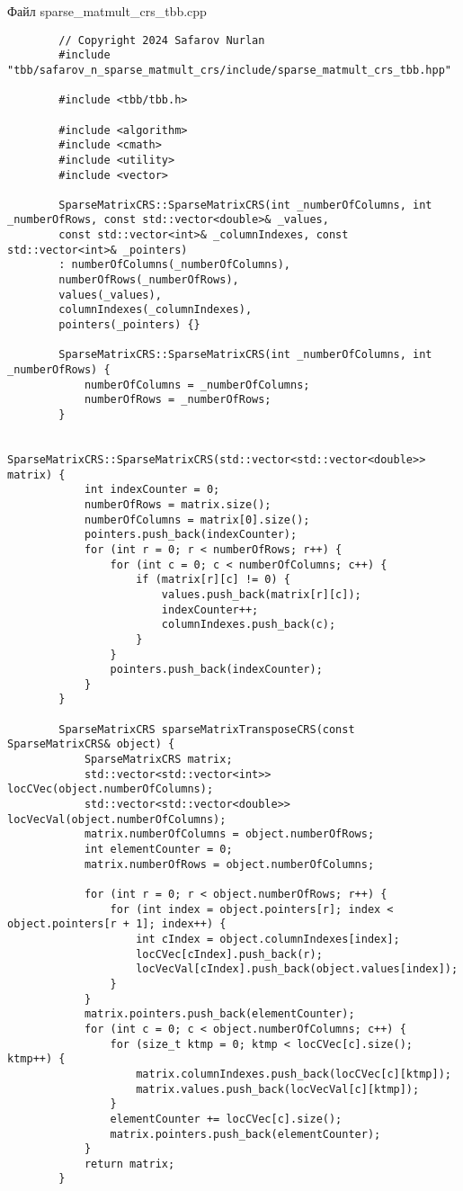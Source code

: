 \documentclass[a4paper, 14pt]{article}
\begin{document}
	Файл sparse\_matmult\_crs\_tbb.cpp
	\begin{verbatim}
		// Copyright 2024 Safarov Nurlan
		#include "tbb/safarov_n_sparse_matmult_crs/include/sparse_matmult_crs_tbb.hpp"
		
		#include <tbb/tbb.h>
		
		#include <algorithm>
		#include <cmath>
		#include <utility>
		#include <vector>
		
		SparseMatrixCRS::SparseMatrixCRS(int _numberOfColumns, int _numberOfRows, const std::vector<double>& _values,
		const std::vector<int>& _columnIndexes, const std::vector<int>& _pointers)
		: numberOfColumns(_numberOfColumns),
		numberOfRows(_numberOfRows),
		values(_values),
		columnIndexes(_columnIndexes),
		pointers(_pointers) {}
		
		SparseMatrixCRS::SparseMatrixCRS(int _numberOfColumns, int _numberOfRows) {
			numberOfColumns = _numberOfColumns;
			numberOfRows = _numberOfRows;
		}
		
		SparseMatrixCRS::SparseMatrixCRS(std::vector<std::vector<double>> matrix) {
			int indexCounter = 0;
			numberOfRows = matrix.size();
			numberOfColumns = matrix[0].size();
			pointers.push_back(indexCounter);
			for (int r = 0; r < numberOfRows; r++) {
				for (int c = 0; c < numberOfColumns; c++) {
					if (matrix[r][c] != 0) {
						values.push_back(matrix[r][c]);
						indexCounter++;
						columnIndexes.push_back(c);
					}
				}
				pointers.push_back(indexCounter);
			}
		}
		
		SparseMatrixCRS sparseMatrixTransposeCRS(const SparseMatrixCRS& object) {
			SparseMatrixCRS matrix;
			std::vector<std::vector<int>> locCVec(object.numberOfColumns);
			std::vector<std::vector<double>> locVecVal(object.numberOfColumns);
			matrix.numberOfColumns = object.numberOfRows;
			int elementCounter = 0;
			matrix.numberOfRows = object.numberOfColumns;
			
			for (int r = 0; r < object.numberOfRows; r++) {
				for (int index = object.pointers[r]; index < object.pointers[r + 1]; index++) {
					int cIndex = object.columnIndexes[index];
					locCVec[cIndex].push_back(r);
					locVecVal[cIndex].push_back(object.values[index]);
				}
			}
			matrix.pointers.push_back(elementCounter);
			for (int c = 0; c < object.numberOfColumns; c++) {
				for (size_t ktmp = 0; ktmp < locCVec[c].size(); ktmp++) {
					matrix.columnIndexes.push_back(locCVec[c][ktmp]);
					matrix.values.push_back(locVecVal[c][ktmp]);
				}
				elementCounter += locCVec[c].size();
				matrix.pointers.push_back(elementCounter);
			}
			return matrix;
		}
		

\end{verbatim}
\end{document}

